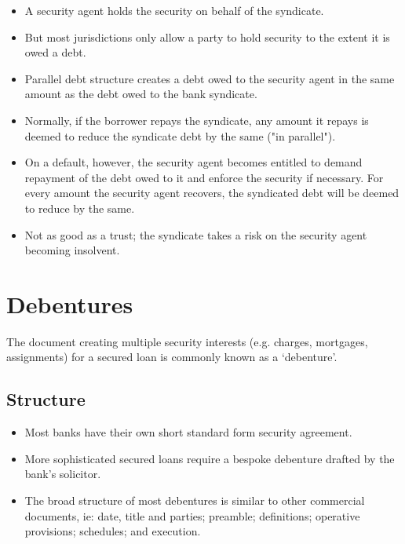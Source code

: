 \documentclass[
]{article}
\providecommand{\tightlist}{%
  \setlength{\itemsep}{0pt}\setlength{\parskip}{0pt}}
\begin{document}
\begin{itemize}
\begin{itemize}
    \begin{itemize}
    \tightlist
    \item
      A security agent holds the security on behalf of the syndicate.
    \item
      But most jurisdictions only allow a party to hold security to the
      extent it is owed a debt.
    \item
      Parallel debt structure creates a debt owed to the security agent
      in the same amount as the debt owed to the bank syndicate.
    \item
      Normally, if the borrower repays the syndicate, any amount it
      repays is deemed to reduce the syndicate debt by the same ("in
      parallel").
    \item
      On a default, however, the security agent becomes entitled to
      demand repayment of the debt owed to it and enforce the security
      if necessary. For every amount the security agent recovers, the
      syndicated debt will be deemed to reduce by the same.
    \item
      Not as good as a trust; the syndicate takes a risk on the security
      agent becoming insolvent.
    \end{itemize}
  \end{itemize}
\end{itemize}

\hypertarget{debentures}{%
\section{Debentures}\label{debentures}}

The document creating multiple security interests (e.g. charges,
mortgages, assignments) for a secured loan is commonly known as a
`debenture'.

\hypertarget{structure}{%
\subsection{Structure}\label{structure}}

\begin{itemize}
\tightlist
\item
  Most banks have their own short standard form security agreement.
\item
  More sophisticated secured loans require a bespoke debenture drafted
  by the bank's solicitor.
\item
  The broad structure of most debentures is similar to other commercial
  documents, ie: date, title and parties; preamble; definitions;
  operative provisions; schedules; and execution.
\end{itemize}
\end{document}
